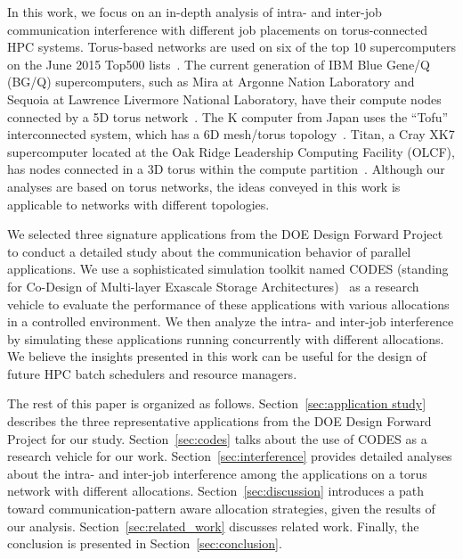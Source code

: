 In this work, we focus on an in-depth analysis of intra- and inter-job 
communication interference with different job placements on torus-connected HPC systems. 
Torus-based networks are used on six of the top 10 supercomputers 
on the June 2015 Top500 lists~\cite{top500}. 
The current generation of IBM Blue Gene/Q (BG/Q) supercomputers, 
such as Mira at Argonne Nation Laboratory and 
Sequoia at Lawrence Livermore National Laboratory, 
have their compute nodes connected by a 5D torus network~\cite{bgq}. 
The K computer from Japan uses the ``Tofu'' interconnected system, 
which has a 6D mesh/torus topology~\cite{tofu}. 
Titan, a Cray XK7 supercomputer located at the Oak Ridge Leadership Computing Facility (OLCF), 
has nodes connected in a 3D torus within the compute partition~\cite{titan}. 
Although our analyses are based on torus networks, 
the ideas conveyed in this work is applicable to networks with different topologies. 

We selected three signature applications from 
the DOE Design Forward Project~\cite{designforwardwebpage}  
to conduct a detailed study about the communication behavior of parallel applications. 
We use a sophisticated simulation toolkit named CODES 
(standing for Co-Design of Multi-layer Exascale Storage Architectures)~\cite{Jason-2011} 
as a research vehicle to evaluate the performance of these applications 
with various allocations in a controlled environment. 
We then analyze the intra- and inter-job interference 
by simulating these applications running concurrently with different allocations. 
We believe the insights presented in this work can be useful 
for the design of future HPC batch schedulers and resource managers.


The rest of this paper is organized as follows. 
Section~\ref{sec:application study} describes the three representative applications 
from the DOE Design Forward Project for our study. 
Section~\ref{sec:codes} talks about the use of CODES as a research vehicle for our work. 
Section~\ref{sec:interference} provides detailed analyses about the intra- and inter-job interference 
among the applications on a torus network with different allocations. 
Section~\ref{sec:discussion} introduces a path toward communication-pattern aware allocation strategies, 
given the results of our analysis. 
Section~\ref{sec:related_work} discusses related work. 
Finally, the conclusion is presented in Section~\ref{sec:conclusion}.




